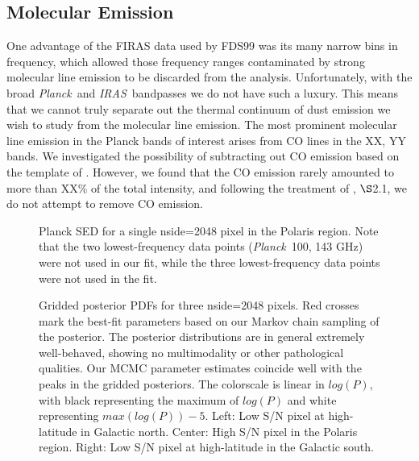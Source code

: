 \documentclass{emulateapj}
\newcommand{\IRAS}{{\it IRAS}}
\newcommand{\PLANCK}{{\it Planck}}
\begin{document}
\subsection{Molecular Emission}
One advantage of the FIRAS data used by FDS99 was its many narrow bins in 
frequency, which allowed those frequency ranges contaminated by strong 
molecular line emission to be discarded from the analysis. Unfortunately, with 
the broad \PLANCK~and \IRAS~bandpasses we do not have such a luxury. This means
 that we cannot truly separate out the thermal continuum of dust emission we 
wish to study from the molecular line emission. The most prominent molecular 
line emission in the Planck bands of interest arises from CO lines in the XX, 
YY bands. We investigated the possibility of subtracting out CO emission based 
on the template of \cite{planckco}. However, we found that the CO emission
rarely amounted to more than XX\% of the total intensity, and following
the treatment of \cite{planckdust}, $\S$2.1, we do not attempt to remove CO
emission.


\begin{figure}
\begin{center}
\caption{\label{fig:sed} Planck SED for a single nside=2048 pixel in the 
Polaris region. Note that the two lowest-frequency data points (\PLANCK~100, 
143 GHz) were not used in our fit, while the three lowest-frequency data
points were not used in the \cite{planckdust} fit.}
\end{center}
\end{figure}

\begin{figure*}
\begin{center}
\caption{Gridded posterior PDFs for three nside=2048 pixels. Red crosses mark 
the best-fit parameters based on our Markov chain sampling of the posterior. 
The posterior distributions are in general extremely well-behaved, showing
no multimodality or other pathological qualities. Our MCMC parameter 
estimates coincide well with the peaks in the gridded posteriors. The 
colorscale is linear in $log(P)$, with black representing the maximum of 
$log(P)$ and white representing $max(log(P))-5$. Left: Low S/N pixel at 
high-latitude in Galactic north. Center: High S/N pixel in the Polaris region. 
Right: Low S/N pixel at high-latitude in the Galactic south.}
\end{center}
\end{figure*}
\end{document}
